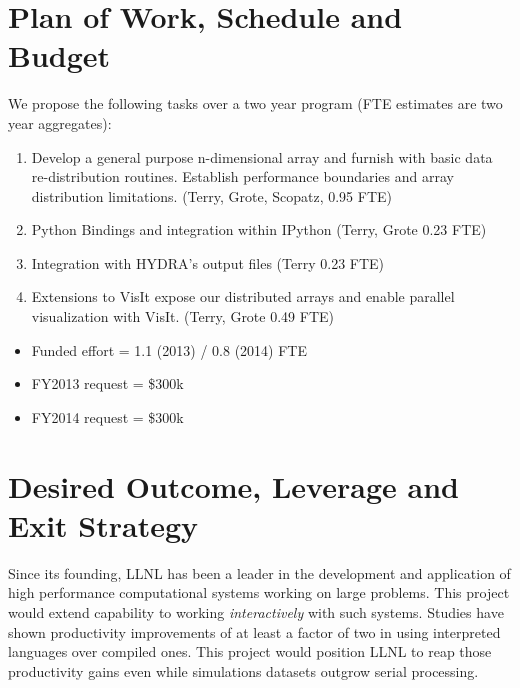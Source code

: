 \documentclass[letterpaper,11pt]{article}
\begin{document}


\section*{Plan of Work, Schedule and Budget}

We propose the following tasks over a two year program (FTE estimates are two year aggregates):

\begin{enumerate}
	\item Develop a general purpose n-dimensional array and furnish with basic data 
		re-distribution routines.  Establish performance boundaries and array distribution 
		limitations. (Terry, Grote, Scopatz, 0.95 FTE) 

	\item Python Bindings and integration within IPython (Terry, Grote 0.23 FTE)

	\item Integration with HYDRA's output files (Terry 0.23 FTE)

	\item Extensions to VisIt expose our distributed arrays and enable parallel visualization 
		with VisIt. (Terry, Grote 0.49 FTE)

\end{enumerate}

\begin{itemize}
	\setlength{\itemsep}{0pt}
	\setlength{\parskip}{0pt}
	\setlength{\parsep}{0pt}

	\item Funded effort = 1.1 (2013) / 0.8 (2014) FTE
	\item FY2013 request =  \$300k
	\item FY2014 request =  \$300k
\end{itemize}


\section*{Desired Outcome, Leverage and Exit Strategy}

Since its founding, LLNL has been a leader in the development and application of high 
performance computational systems working on large problems.  This project would extend 
capability to working \emph{interactively} with such systems.  Studies have shown productivity 
improvements of at least a factor of two\cite{Prechelt2000} in using interpreted languages 
over compiled ones.  This project would position LLNL to reap those productivity gains even 
while simulations datasets outgrow serial processing.
\end{document}
